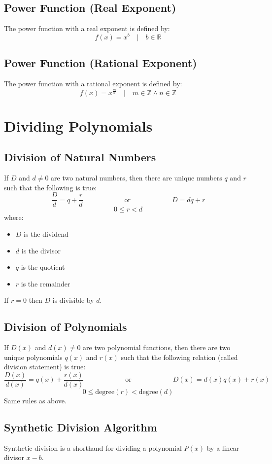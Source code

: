 		\subsection{Power Function (Real Exponent)}
			The power function with a real exponent is defined by:
			\[f(x)=x^b \quad | \quad b \in \mathbb{R}\]
		\subsection{Power Function (Rational Exponent)}
			The power function with a rational exponent is defined by:
			\[f(x)=x^{\frac{m}{n}} \quad | \quad m \in \mathbb{Z} \wedge n \in \mathbb{Z}\]
	\section{Dividing Polynomials}
		\subsection{Division of Natural Numbers}
			If $D$ and $d \neq 0$ are two natural numbers, then there are unique numbers $q$ and $r$ such that the following is true:
			\[\frac{D}{d}=q+\frac{r}{d} \qquad\qquad\qquad \text{or} \qquad\qquad\qquad D=dq+r\] 
			\[0 \leq r < d\]
			where:
			\begin{itemize}
				\item $D$ is the dividend
				\item $d$ is the divisor
				\item $q$ is the quotient
				\item $r$ is the remainder
			\end{itemize}

			If $r=0$ then $D$ is divisible by $d$.
		\subsection{Division of Polynomials}
			If $D(x)$ and $d(x) \neq 0$ are two polynomial functions, then there are two unique polynomials $q(x)$ and $r(x)$ such that the following relation (called division statement) is true:
			\[\frac{D(x)}{d(x)}=q(x)+\frac{r(x)}{d(x)} \qquad\qquad\qquad \text{or} \qquad\qquad\qquad D(x)=d(x)q(x)+r(x)\] 
			\[0 \leq \text{degree}(r) < \text{degree}(d)\]
			Same rules as above.
		\newpage
		\subsection{Synthetic Division Algorithm}
			Synthetic division is a shorthand for dividing a polynomial $P(x)$ by a linear divisor $x-b$.
